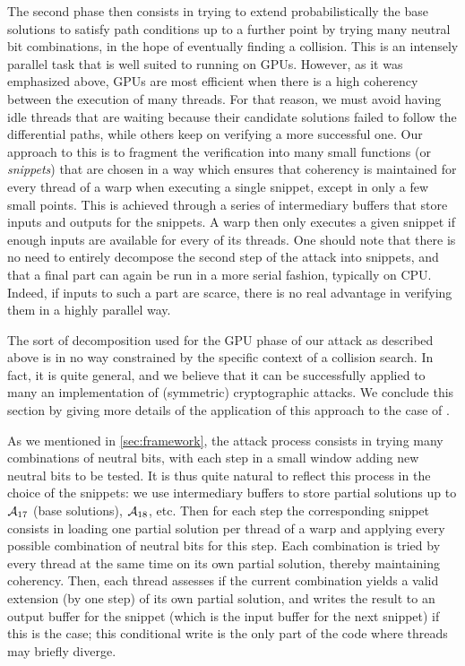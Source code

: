 The second phase then consists in trying to extend probabilistically the base solutions to satisfy path conditions up to a further point by
trying many neutral bit combinations, in the hope of eventually finding a collision.
This is an intensely parallel task that is well suited to running on GPUs. However, as it
was emphasized above, GPUs are most efficient when there is a high coherency between the execution of many threads. For that reason,
we must avoid having idle threads that are waiting because their candidate solutions failed to follow the differential paths, while
others keep on verifying a more successful one. Our approach to this is to fragment the verification into many small functions
(or \emph{snippets})
that are chosen in a way which ensures that coherency is maintained for every thread of a warp when executing a single snippet, except in
only a few small points. This is achieved through a series of intermediary buffers that store inputs and outputs for the snippets.
A warp then only executes a given snippet if enough inputs are available for every of its threads.
One should note that there is no need to entirely decompose the second step of the attack into snippets, and that a final part can again
be run in a more serial fashion, typically on CPU. Indeed, if inputs to such a part are scarce, there is no real advantage in verifying them in
a highly parallel way.


The sort of decomposition used for the GPU phase of our attack as described above is in no way constrained by the specific context of a \shaone collision search.
In fact, it is quite general, and we believe that it can be successfully applied to many an implementation of (symmetric) cryptographic
attacks. We conclude this section by giving more details of the application of this approach to the case of \shaone.


\bigskip

As we mentioned in \autoref{sec:framework}, the attack process consists in trying many combinations of neutral bits, with each step in a small window
adding new neutral bits to be tested. It is thus quite natural to reflect this process in the choice of the snippets:
we use intermediary buffers to store partial solutions up to $\mathcal{A}_{17}$ (\ie base solutions), $\mathcal{A}_{18}$, etc.
Then for each step the corresponding snippet consists
in loading one partial solution per thread of a warp and applying every possible combination of neutral bits for this step. Each combination
is tried by every thread at the same time on its own partial solution, thereby maintaining coherency.
Then, each thread assesses if the current combination yields a valid extension (by one step) of its own partial solution, and writes the result to
an output buffer for the snippet (which is the input buffer for the next snippet) if this is the case;
this conditional write is the only part of the code where threads may briefly diverge.

